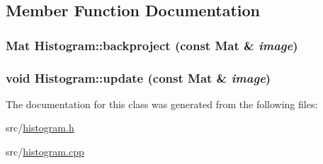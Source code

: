\subsection{Member Function Documentation}
\hypertarget{class_histogram_a9441aea95de9a366a15c0078ba12da74}{
\subsubsection[{backproject}]{\setlength{\rightskip}{0pt plus 5cm}Mat Histogram::backproject (const Mat \& {\em image})}}
\label{class_histogram_a9441aea95de9a366a15c0078ba12da74}
\hypertarget{class_histogram_a3fad34a25e6791d1b45a2daabb9ad2fe}{
\subsubsection[{update}]{\setlength{\rightskip}{0pt plus 5cm}void Histogram::update (const Mat \& {\em image})}}
\label{class_histogram_a3fad34a25e6791d1b45a2daabb9ad2fe}


The documentation for this class was generated from the following files:\begin{DoxyCompactItemize}
\item 
src/\hyperlink{histogram_8h}{histogram.h}\item 
src/\hyperlink{histogram_8cpp}{histogram.cpp}\end{DoxyCompactItemize}
